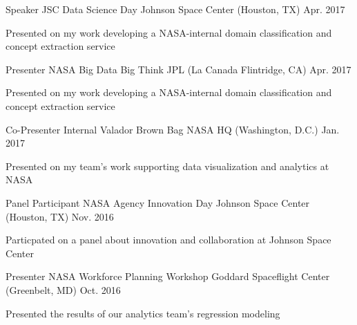 \begin{cventries}
  \cventry
    {Speaker} %
    {JSC Data Science Day} %
    {Johnson Space Center (Houston, TX)} %
    {Apr. 2017} %
    {
      \begin{cvitems} %
        \item {Presented on my work developing a NASA-internal domain classification and concept extraction service}
      \end{cvitems}
    }
    
  \cventry
    {Presenter} %
    {NASA Big Data Big Think} %
    {JPL (La Canada Flintridge, CA)} %
    {Apr. 2017} %
    {
      \begin{cvitems} %
        \item {Presented on my work developing a NASA-internal domain classification and concept extraction service}
      \end{cvitems}
    }


  \cventry
    {Co-Presenter} %
    {Internal Valador Brown Bag} %
    {NASA HQ (Washington, D.C.)} %
    {Jan. 2017} %
    {
      \begin{cvitems} %
        \item {Presented on my team's work supporting data visualization and analytics at NASA}
      \end{cvitems}
    }

  \cventry
    {Panel Participant} %
    {NASA Agency Innovation Day} %
    {Johnson Space Center (Houston, TX)} %
    {Nov. 2016} %
    {
      \begin{cvitems} %
        \item {Particpated on a panel about innovation and collaboration at Johnson Space Center}
      \end{cvitems}
    }

  \cventry
    {Presenter} %
    {NASA Workforce Planning Workshop} %
    {Goddard Spaceflight Center (Greenbelt, MD)} %
    {Oct. 2016} %
    {
      \begin{cvitems} %
        \item {Presented the results of our analytics team's regression modeling}
      \end{cvitems}
    }
    

\end{cventries}
